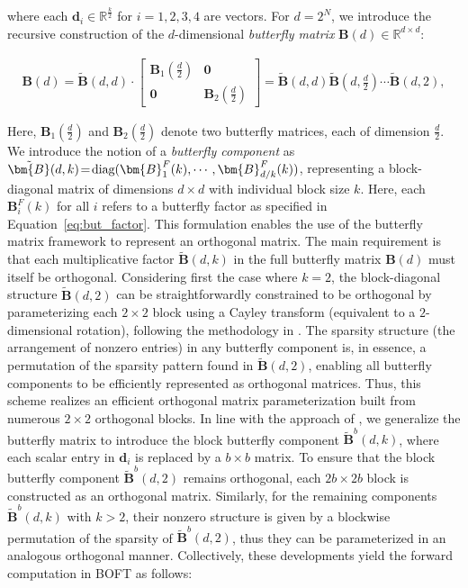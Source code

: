where each $\bm{d}_i\in\mathbb{R}^{\frac{k}{2}}$ for $i=1,2,3,4$ are vectors. For $d=2^N$, we introduce the recursive construction of the $d$-dimensional \emph{butterfly matrix} $\bm{B}(d)\in\mathbb{R}^{d\times d}$:

\begin{equation}
\begin{aligned}
    \!\!\bm{B}(d)=\tilde{\bm{B}}(d,d)\!\cdot\!\begin{bmatrix}
    \bm{B}_1(\frac{d}{2})\!\!\!\!\! & \bm{0} \\
    \bm{0}\!\!\!\!\! &\bm{B}_2(\frac{d}{2})
    \end{bmatrix}= \tilde{\bm{B}}(d,d)\tilde{\bm{B}}(d,\frac{d}{2})\cdots\tilde{\bm{B}}(d,2),
\end{aligned}
\end{equation}

Here, $\bm{B}_1(\frac{d}{2})$ and $\bm{B}_2(\frac{d}{2})$ denote two butterfly matrices, each of dimension $\frac{d}{2}$. We introduce the notion of a \emph{butterfly component} as $\thickmuskip=2mu \medmuskip=2mu \tilde{\bm{B}}(d,k)=\text{diag}(\bm{B}^F_1(k),\cdots,\bm{B}^F_{d/k}(k))$, representing a block-diagonal matrix of dimensions $d\times d$ with individual block size $k$. Here, each $\bm{B}^F_i(k)$ for all $i$ refers to a butterfly factor as specified in Equation~\ref{eq:but_factor}. This formulation enables the use of the butterfly matrix framework to represent an orthogonal matrix. The main requirement is that each multiplicative factor $\tilde{\bm{B}}(d,k)$ in the full butterfly matrix $\bm{B}(d)$ must itself be orthogonal. Considering first the case where $k=2$, the block-diagonal structure $\tilde{\bm{B}}(d,2)$ can be straightforwardly constrained to be orthogonal by parameterizing each $2\times 2$ block using a Cayley transform (equivalent to a $2$-dimensional rotation), following the methodology in \cite{liu2021orthogonal,qiu2023controlling}. The sparsity structure (the arrangement of nonzero entries) in any butterfly component is, in essence, a permutation of the sparsity pattern found in $\tilde{\bm{B}}(d,2)$, enabling all butterfly components to be efficiently represented as orthogonal matrices. Thus, this scheme realizes an efficient orthogonal matrix parameterization built from numerous $2\times 2$ orthogonal blocks. In line with the approach of \cite{chen2022pixelated}, we generalize the butterfly matrix to introduce the block butterfly component $\tilde{\bm{B}}^b(d,k)$, where each scalar entry in $\bm{d}_i$ is replaced by a $b\times b$ matrix. To ensure that the block butterfly component $\tilde{\bm{B}}^b(d,2)$ remains orthogonal, each $2b\times 2b$ block is constructed as an orthogonal matrix. Similarly, for the remaining components $\tilde{\bm{B}}^b(d,k)$ with $k>2$, their nonzero structure is given by a blockwise permutation of the sparsity of $\tilde{\bm{B}}^b(d,2)$, thus they can be parameterized in an analogous orthogonal manner. Collectively, these developments yield the forward computation in BOFT as follows:

